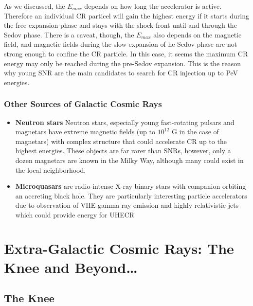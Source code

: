 \documentclass[
  letterpaper,
  DIV=11,
  numbers=noendperiod]{scrreprt}
\begin{document}
As we discussed, the \(E_{max}\) depends on how long the accelerator is
active. Therefore an individual CR particel will gain the highest energy
if it starts during the free expansion phase and stays with the shock
front until and through the Sedov phase. There is a caveat, though, the
\(E_{max}\) also depends on the magnetic field, and magnetic fields
during the slow expansion of he Sedov phase are not strong enough to
confine the CR particle. In this case, it seems the maximum CR energy
may only be reached during the pre-Sedov expansion. This is the reason
why young SNR are the main candidates to search for CR injection up to
PeV energies.

\subsubsection*{Other Sources of Galactic Cosmic
Rays}\label{other-sources-of-galactic-cosmic-rays}

\begin{itemize}
\item
  \textbf{Neutron stars} Neutron stars, especially young fast-rotating
  pulsars and magnetars have extreme magnetic fields (up to \(10^{12}\)
  G in the case of magnetars) with complex structure that could
  accelerate CR up to the highest energies. These objects are far rarer
  than SNRs, however, only a dozen magnetars are known in the Milky Way,
  although many could exist in the local neighborhood.
\item
  \textbf{Microquasars} are radio-intense X-ray binary stars with
  companion orbiting an accreting black hole. They are particularly
  interesting particle accelerators due to observation of VHE gamma ray
  emission and highly relativistic jets which could provide energy for
  UHECR
\end{itemize}

\section*{Extra-Galactic Cosmic Rays: The Knee and
Beyond\ldots{}}\label{extra-galactic-cosmic-rays-the-knee-and-beyond}


\subsection*{The Knee}\label{sec-knee}
\end{document}
